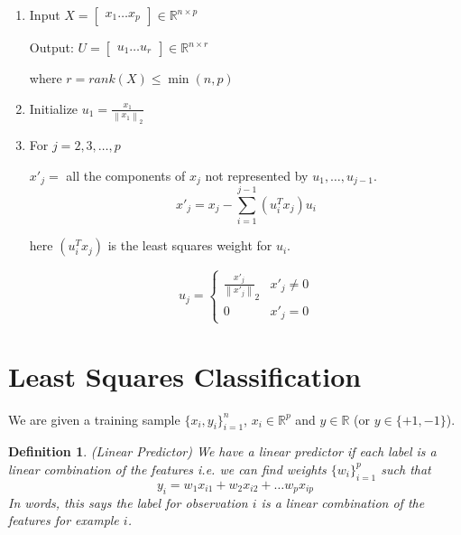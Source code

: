 \documentclass[12pt]{article}
\newtheorem{definition}{Definition}
\theoremstyle{definition}
\newcommand{\R}{\mathbb{R}}
\newcommand{\norm}[1]{\left\lVert#1\right\rVert}
\begin{document}
\begin{enumerate}
	\item Input $X = \begin{bmatrix} x_1 \ldots x_p \end{bmatrix} \in \R^{n \times p}$ 

	Output: $U = \begin{bmatrix} u_1 \ldots u_r \end{bmatrix} \in \R^{n \times r}$

	where $r = rank(X) \leq \min(n,p)$

	\item Initialize $u_1 = \frac{x_1}{\norm{x_1}_2}$
	\item For $j=2,3, \ldots, p$
	
	$x'_j = $ all the components of $x_j$ not represented by $u_1, \ldots, u_{j-1}$. 
	\begin{equation}
		x'_j = x_j - \sum_{i=1}^{j-1} (u_i^T x_j) u_i
	\end{equation}

	here $(u_i^T x_j)$ is the least squares weight for $u_i$. 

	\begin{equation}
	u_j = 
	\begin{cases}
	\frac{x'_j}{\norm{x'_j}}_2 & x'_j \neq 0 \\
	0 & x'_j = 0
	\end{cases}
	\end{equation}


\end{enumerate}

\section{Least Squares Classification}
We are given a training sample $\{x_i, y_i \}_{i=1}^n$, $x_i \in \R^p$ and $y\in \R$ (or $y \in \{+1,-1\}$).

\begin{definition}(Linear Predictor)
We have a linear predictor if each label is a linear combination of the features i.e. we can find weights $\{w_i\}_{i=1}^{p}$ such that
\begin{equation}
y_i = w_1 x_{i1} + w_2 x_{i2} + \ldots w_p x_{ip}
\end{equation}
In words, this says the label for observation $i$ is a linear combination of the features for example $i$. 
\end{definition}
\end{document}
